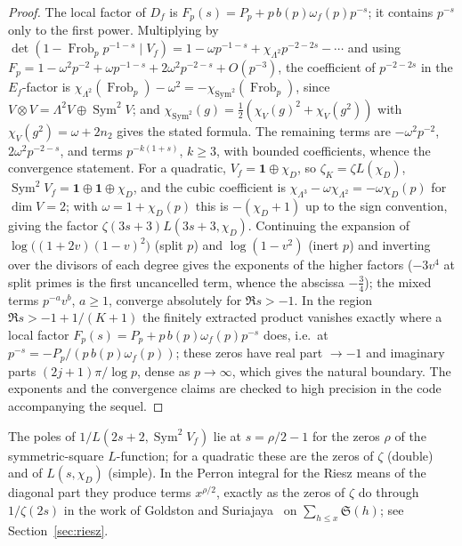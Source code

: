 \documentclass[11pt,a4paper]{article}
\theoremstyle{remark}\newtheorem{remark}[theorem]{Remark}
\newcommand{\Sig}{\mathfrak S}
\begin{document}
\begin{proof}
The local factor of $D_f$ is $F_p(s)=P_p+p\,b(p)\omega_f(p)p^{-s}$; it contains $p^{-s}$ only to the first
power. Multiplying by $\det(1-\operatorname{Frob}_pp^{-1-s}\mid V_f)=1-\omega p^{-1-s}+\chi_{\Lambda^2}p^{-2-2s}-\cdots$
and using $F_p=1-\omega^2p^{-2}+\omega p^{-1-s}+2\omega^2p^{-2-s}+O(p^{-3})$, the coefficient of $p^{-2-2s}$ in
the $E_f$-factor is $\chi_{\Lambda^2}(\operatorname{Frob}_p)-\omega^2=-\chi_{\operatorname{Sym}^2}(\operatorname{Frob}_p)$, since
$V\otimes V=\Lambda^2V\oplus\operatorname{Sym}^2V$; and $\chi_{\operatorname{Sym}^2}(g)=\tfrac12(\chi_V(g)^2+\chi_V(g^2))$ with
$\chi_V(g^2)=\omega+2n_2$ gives the stated formula. The remaining terms are $-\omega^2p^{-2}$, $2\omega^2p^{-2-s}$,
and terms $p^{-k(1+s)}$, $k\ge3$, with bounded coefficients, whence the convergence statement. For a
quadratic, $V_f=\mathbf 1\oplus\chi_D$, so $\zeta_K=\zeta L(\chi_D)$, $\operatorname{Sym}^2V_f=\mathbf 1\oplus\mathbf 1\oplus\chi_D$,
and the cubic coefficient is $\chi_{\Lambda^3}-\omega\chi_{\Lambda^2}=-\omega\chi_D(p)$ for $\dim V=2$; with
$\omega=1+\chi_D(p)$ this is $-(\chi_D+1)$ up to the sign convention, giving the factor $\zeta(3s+3)L(3s+3,\chi_D)$.
Continuing the expansion of $\log\bigl((1+2v)(1-v)^2\bigr)$ (split $p$) and $\log(1-v^2)$ (inert $p$) and
inverting over the divisors of each degree gives the exponents of the higher factors ($-3v^4$ at split
primes is the first uncancelled term, whence the abscissa $-\tfrac34$); the mixed terms $p^{-a}v^b$,
$a\ge1$, converge absolutely for $\Re s>-1$. In the region $\Re s>-1+1/(K+1)$ the finitely extracted
product vanishes exactly where a local factor $F_p(s)=P_p+p\,b(p)\omega_f(p)p^{-s}$ does, i.e.\ at
$p^{-s}=-P_p/(p\,b(p)\omega_f(p))$; these zeros have real part $\to-1$ and imaginary parts
$(2j+1)\pi/\log p$, dense as $p\to\infty$, which gives the natural boundary. The exponents and the
convergence claims are checked to high precision in the code accompanying the sequel.
\end{proof}

The poles of $1/L(2s+2,\operatorname{Sym}^2V_f)$ lie at $s=\rho/2-1$ for the zeros $\rho$ of the symmetric-square
$L$-function; for a quadratic these are the zeros of $\zeta$ (double) and of $L(s,\chi_D)$ (simple). In the
Perron integral for the Riesz means of the diagonal part they produce terms $x^{\rho/2}$, exactly as the
zeros of $\zeta$ do through $1/\zeta(2s)$ in the work of Goldston and
Suriajaya~\cite{GoldstonSuriajaya2021} on $\sum_{h\le x}\Sig(h)$; see Section~\ref{sec:riesz}.
\end{document}
